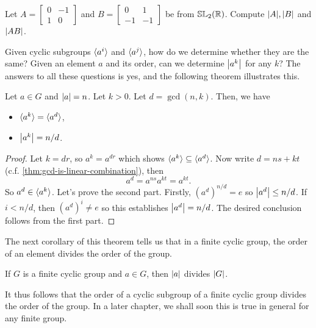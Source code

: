 \documentclass[./main.tex]{subfiles}
\begin{document}
\begin{exercise}
    Let $A = \begin{bmatrix} 0 & -1\\ 1 & 0 \end{bmatrix}$ and $B =
    \begin{bmatrix} 0 & 1 \\ -1 & -1 \end{bmatrix}$ be from
    $\mathbb{SL}_2(\mathbb{R})$. Compute $\abs A, \abs B$ and $\abs{AB}$.
\end{exercise}

Given cyclic subgroups ${ \langle a^i \rangle }$ and ${ \langle a^j \rangle }$, how do we determine whether
they are the same? Given an element $a$ and its order, can we determine
$\abs{a^k}$ for any $k$? The answers to all these questions is yes, and the
following theorem illustrates this.
\begin{theorem}
\label{thm:criterion-for-cyclic-subgrou-equivalence}
    Let $a \in G$ and $\abs a = n$. Let $k > 0$. Let $d = \gcd(n, k)$. Then, we
    have
    \begin{itemize}
        \item ${ \langle a^k \rangle } = { \langle a^d \rangle }$,
        \item $\abs{a^k} = n/d$.
    \end{itemize}
\end{theorem}
\begin{proof}
    Let $k = dr$, so $a^k = a^{dr}$ which shows ${ \langle a^k \rangle } \subseteq { \langle a^d \rangle }$.
    Now write $d = ns + kt$ (c.f. \cref{thm:gcd-is-linear-combination}), then
    \[
        a^d = a^{ns} a^{kt} = a^{kt}. 
    \]
    So $a^d \in { \langle a^k \rangle }$. Let's prove the second part. Firstly, $(a^d)^{n/d} =
    e$ so $\abs{a^d} \leq n/d$. If $i < n/d$, then $(a^d)^i \neq e$ so this
    establishes $\abs{a^d} = n/d$. The desired conclusion follows from the first
    part.
\end{proof}

The next corollary of this theorem tells us that in a finite cyclic group, the
order of an element divides the order of the group.
\begin{corollary}
\label{cor:order-element-divides-order-group-fin-cyclic-group}
    If $G$ is a finite cyclic group and $a \in G$, then $\abs a$ divides $\abs
    G$.
\end{corollary}
It thus follows that the order of a cyclic subgroup of a finite cyclic group divides
the order of the group. In a later chapter, we shall soon this is true in
general for any finite group.
\end{document}
